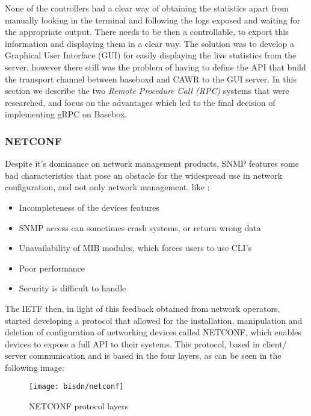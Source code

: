 None of the controllers had a clear way of obtaining the statistics apart from manually looking in the terminal and following the logs exposed and waiting for the appropriate output. There needs to be then a controllable, to export
this information and displaying them in a clear way. The solution was to develop a Graphical User Interface (GUI) for easily displaying the live statistics from the server, however there still was the problem of having to 
define the API that build the transport channel between baseboxd and CAWR to the GUI server. In this section we describe the two \textit {Remote Procedure Call (RPC)} systems that were researched, and focus on the advantages which
led to the final decision of implementing gRPC on Basebox.

\subsubsection {NETCONF} \label {ssec:netconf}

Despite it's dominance on network management products, SNMP features some bad characteristics that pose an obstacle for the widespread use in network configuration, and not only network management, like 
\cite {CITE - https://tools.ietf.org/html/rfc3535}: 

\begin {itemize}
    \item Incompleteness of the devices features
    \item SNMP access can sometimes crash systems, or return wrong data
    \item Unavailability of MIB modules, which forces users to use CLI's
    \item Poor performance 
    \item Security is difficult to handle
\end {itemize}

\par The IETF then, in light of this feedback obtained from network operators, started developing a protocol that allowed for the installation, manipulation and deletion of configuration of networking devices called NETCONF, which 
enables devices to expose a full API to their systems. This protocol, based in client/ server communication and is based in the four layers, as can be seen in the following image:

\begin{figure} [!htbp]
    \centering
    \texttt{[image: bisdn/netconf]}
    \caption{NETCONF protocol layers \cite {CITE - Basebox architecture}}
\end{figure}

